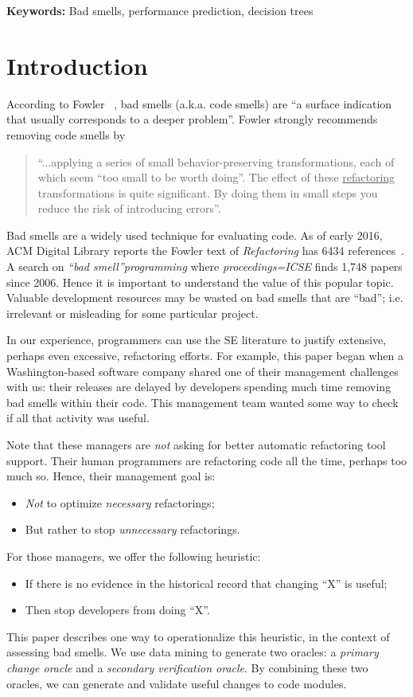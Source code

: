 \documentclass[twocolumn,5p]{elsarticle}
\newcommand{\bi}{\begin{itemize}[leftmargin=0.4cm]}
\newcommand{\ei}{\end{itemize}}
\theoremstyle{break}
\begin{document}
\vspace{1mm}
\noindent
{\bf Keywords:} Bad smells,
performance prediction,  decision trees 




\section{Introduction}

According to   Fowler ~\cite{fowler99}, bad smells (a.k.a. code smells)
are ``a surface indication that usually corresponds to a deeper problem''.
Fowler strongly recommends   removing   code smells   by
\begin{quote}
``...applying a series of small behavior-preserving transformations, each 
of which seem ``too small to be worth doing''. 
The  effect of   these \underline{refactoring} transformations is quite significant. By doing them in small steps you reduce the risk 
of introducing errors''.
\end{quote}
Bad smells are a widely used technique for evaluating code. As of  early 2016, ACM Digital Library reports 
the Fowler text of {\em Refactoring} has 6434 references~\cite{fowler99}. A search  on {\em ``bad smell''programming} 
where {\em proceedings=ICSE} finds 1,748 papers since 2006.
Hence it is important to understand the value of
this popular topic.  
Valuable development resources may be wasted on bad smells that are ``bad''; i.e. 
 irrelevant or misleading
for some particular project.

In our experience, programmers can use the SE literature to justify extensive, perhaps even excessive, refactoring efforts.
For example, this paper began when a Washington-based software company shared
one of their management challenges with us: their  releases are delayed by developers spending  much time removing bad smells within their code. This management team wanted some way to check if all that activity was useful.
 
Note that these managers are {\em not} asking for better
automatic refactoring
tool support. Their human programmers are refactoring
code all the time, perhaps too much so.
Hence, their management goal is: 
\bi
\item
{\em Not} to optimize {\em necessary} refactorings;
\item
But rather to stop {\em unnecessary} refactorings.
\ei
For those managers, we offer the  following heuristic:
\bi
\item If there is no evidence in the historical record that changing ``X'' is useful;
\item Then stop developers from doing ``X''.
\ei
This paper describes one way to operationalize this heuristic, in the context
of assessing bad smells. We use data mining to generate two oracles: a {\em primary
change oracle} and a {\em secondary verification oracle}.
By combining these two oracles,
 we can generate and validate useful
changes to code modules.
\end{document}
